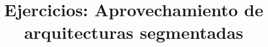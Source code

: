 

\title{Ejercicios: Aprovechamiento de arquitecturas segmentadas}



\maketitle

\pagestyle{fancyplain}





